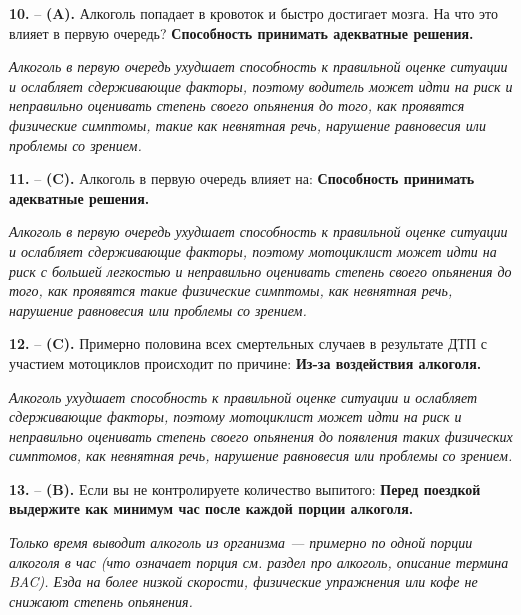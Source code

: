 \begin{minipage}{\linewidth}
\noindent\textbf{10.}  -- \textbf {(A).} Алкоголь попадает в кровоток и быстро достигает мозга. На что это влияет в первую очередь?  \textbf {Способность принимать адекватные решения.} \par \textit {Алкоголь в первую очередь ухудшает способность к правильной оценке ситуации и ослабляет сдерживающие факторы, поэтому водитель может идти на риск и неправильно оценивать степень своего опьянения до того, как проявятся физические симптомы, такие как невнятная речь, нарушение равновесия или проблемы со зрением.} \\
\end{minipage}

\begin{minipage}{\linewidth}
\noindent\textbf{11.}  -- \textbf {(C).} Алкоголь в первую очередь влияет на:  \textbf {Способность принимать адекватные решения.} \par \textit {Алкоголь в первую очередь ухудшает способность к правильной оценке ситуации и ослабляет сдерживающие факторы, поэтому мотоциклист может идти на риск с большей легкостью и неправильно оценивать степень своего опьянения до того, как проявятся такие физические симптомы, как невнятная речь, нарушение равновесия или проблемы со зрением.} \\
\end{minipage}

\begin{minipage}{\linewidth}
\noindent\textbf{12.}  -- \textbf {(C).} Примерно половина всех смертельных случаев в результате ДТП с участием мотоциклов происходит по причине:  \textbf {Из-за воздействия алкоголя.} \par \textit {Алкоголь ухудшает способность к правильной оценке ситуации и ослабляет сдерживающие факторы, поэтому мотоциклист может идти на риск и неправильно оценивать степень своего опьянения до появления таких физических симптомов, как невнятная речь, нарушение равновесия или проблемы со зрением.} \\
\end{minipage}

\begin{minipage}{\linewidth}
\noindent\textbf{13.}  -- \textbf {(B).} Если вы не контролируете количество выпитого:  \textbf {Перед поездкой выдержите как минимум час после каждой порции алкоголя.} \par \textit {Только время выводит алкоголь из организма — примерно по одной порции алкоголя в час (что означает порция см. раздел про алкоголь, описание термина BAC). Езда на более низкой скорости, физические упражнения или кофе не снижают степень опьянения.} \\
\end{minipage}

